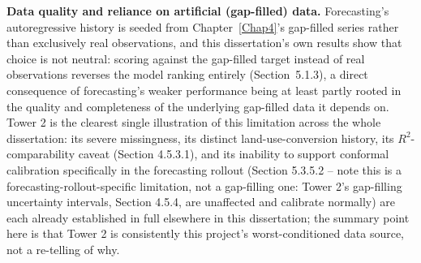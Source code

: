 
\textbf{Data quality and reliance on artificial (gap-filled) data.} Forecasting's autoregressive
history is seeded from Chapter~\ref{Chap4}'s gap-filled series rather than exclusively real
observations, and this dissertation's own results show that choice is not neutral: scoring against
the gap-filled target instead of real observations reverses the model ranking entirely
(Section~5.1.3), a direct consequence of forecasting's weaker performance being at least partly
rooted in the quality and completeness of the underlying gap-filled data it depends on. Tower 2 is
the clearest single illustration of this limitation across the whole dissertation: its severe
missingness, its distinct land-use-conversion history, its $R^2$-comparability caveat
(Section 4.5.3.1), and its inability to support conformal calibration specifically in the
forecasting rollout (Section 5.3.5.2 -- note this is a forecasting-rollout-specific limitation, not
a gap-filling one: Tower 2's gap-filling uncertainty intervals, Section 4.5.4, are unaffected and
calibrate normally) are each already established in full elsewhere in this dissertation; the summary
point here is that Tower 2 is consistently this project's worst-conditioned data source, not a
re-telling of why.

